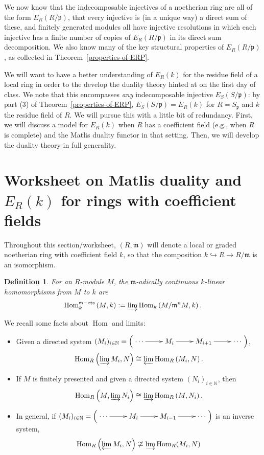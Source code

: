 \documentclass[11pt]{book}
\newtheorem{definition}[theorem]{Definition}
\numberwithin{equation}{section}
\numberwithin{theorem}{chapter}
\theoremstyle{definition}
\newtheorem*{basic properties}{Basic Properties}
\newtheorem*{Important Remark}{Important Remark}
\theoremstyle{remark}
\newcommand{\NN}{\mathbb{N}}
\newcommand{\m}{\mathfrak{m}}
\newcommand{\p}{\mathfrak{p}}
\newcommand{\Hom}{\operatorname{Hom}}
\begin{document}
We now know that the indecomposable injectives of a noetherian ring are all of the form $E_R(R/\p)$, that every injective is (in a unique way) a direct sum of these, and finitely generated modules all have injective resolutions in which each injective has a finite number of copies of $E_R(R/\p)$ in its direct sum decomposition. We also know many of the key structural properties of $E_R(R/\p)$, as collected in Theorem~\ref{properties-of-ERP}. 

We will want to have a better understanding of $E_R(k)$ for the residue field of a local ring in order to the develop the duality theory hinted at on the first day of class. We note that this encompasses \emph{any} indecomposable injective $E_S(S/\p)$: by part (3) of Theorem~\ref{properties-of-ERP},  $E_S(S/\p)=E_R(k)$ for $R=S_\p$ and $k$ the residue field of $R$. We will pursue this with a little bit of redundancy. First, we will discuss a model for $E_R(k)$ when $R$ has a coefficient field (e.g., when $R$ is complete) and the Matlis duality functor in that setting. Then, we will develop the duality theory in full generality.

\section{Worksheet on Matlis duality and $E_R(k)$ for rings with coefficient fields}

 Throughout this section/worksheet, $(R, \m)$ will denote a local or graded noetherian ring with coefficient field $k$, so that the composition $k \hookrightarrow R \to R/\m$
is an isomorphism.


\begin{definition}\index{$\m$-adically continuous Hom}\index{$\Hom_k^{\m-\textrm{cts}}$} For an $R$-module $M$, the \emph{$\m$-adically continuous $k$-linear homomorphisms from $M$ to $k$} are 
$$\Hom_k^{\m-\textrm{cts}} \left( M, k \right) := \varinjlim \Hom_k \left( M/\m^n M, k \right).$$
\end{definition}


\noindent We recall some facts about $\Hom$ and limits:

\begin{itemize}
	\item Given a directed system $(M_i)_{i\in \NN} = \left( \xymatrix{\cdots \ar[r] & M_i \ar[r] & M_{i+1} \ar[r] & \cdots} \right)$,
	$$\Hom_R \left( \varinjlim M_i, N \right) \cong \varprojlim \Hom_R \left( M_i, N \right).$$
	\item If $M$ is finitely presented and given a directed system $(N_i)_{i\in \NN}$, then
	$$\Hom_R \left( M, \varinjlim N_i \right) \cong \varinjlim \Hom_R \left( M, N_i \right).$$
	\item In general, if $(M_i)_{i\in \NN} = \left( \xymatrix{\cdots \ar[r] & M_i \ar[r] & M_{i-1} \ar[r] & \cdots} \right)$ is an inverse system,
	$$\Hom_R \left( \varprojlim M_i, N \right) \not\cong \varinjlim \Hom_R (M_i, N)$$
\end{itemize}
\end{document}
